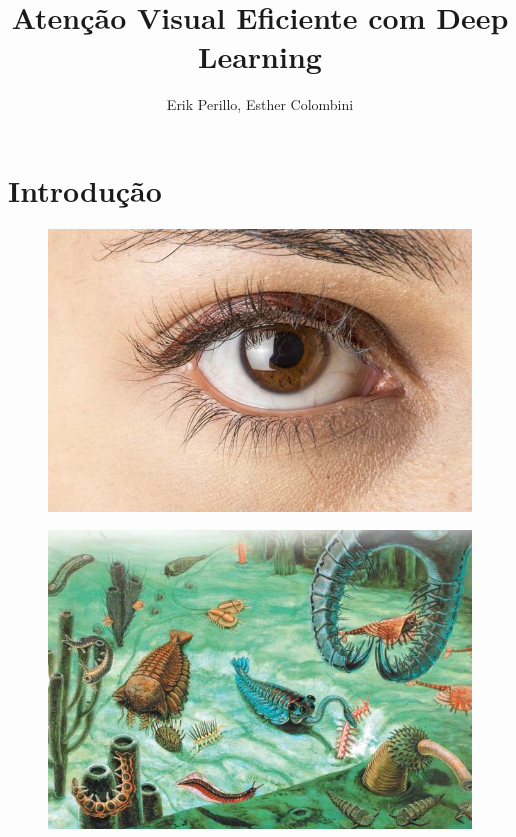 \documentclass[10pt]{beamer}
\title{Atenção Visual Eficiente com Deep Learning}
\subtitle{}
\author{Erik Perillo, Esther Colombini}
\date{}
\institute{Instituto de Computação -- Unicamp}
\begin{document}
\maketitle

\section{Introdução}

\begin{frame}{}
    \begin{figure}
        \centering
        \includegraphics[width=1.0\linewidth]{./img/eye.jpg}
    \end{figure}
\end{frame}

\begin{frame}{}
    \begin{figure}
        \centering
        \includegraphics[width=1.0\linewidth]{./img/precambrian}
    \end{figure}
\end{frame}
\end{document}
